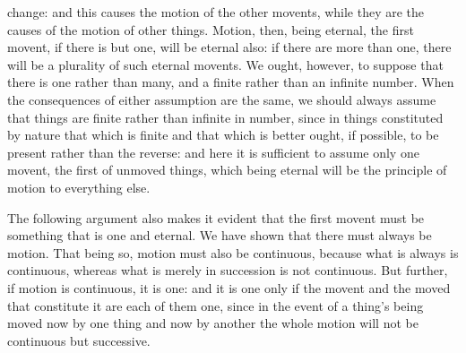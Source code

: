 change: and this causes the motion of the other movents, while they
are the causes of the motion of other things. Motion, then, being
eternal, the first movent, if there is but one, will be eternal also:
if there are more than one, there will be a plurality of such eternal
movents. We ought, however, to suppose that there is one rather than
many, and a finite rather than an infinite number. When the consequences
of either assumption are the same, we should always assume that things
are finite rather than infinite in number, since in things constituted
by nature that which is finite and that which is better ought, if
possible, to be present rather than the reverse: and here it is sufficient
to assume only one movent, the first of unmoved things, which being
eternal will be the principle of motion to everything else.

The following argument also makes it evident that the first movent
must be something that is one and eternal. We have shown that there
must always be motion. That being so, motion must also be continuous,
because what is always is continuous, whereas what is merely in succession
is not continuous. But further, if motion is continuous, it is one:
and it is one only if the movent and the moved that constitute it
are each of them one, since in the event of a thing's being moved
now by one thing and now by another the whole motion will not be continuous
but successive. 

